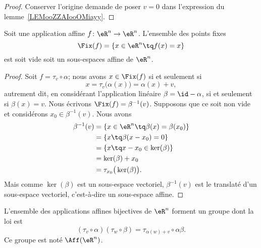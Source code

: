 \begin{proof}
    Conserver l'origine demande de poser \( v=0\) dans l'expression du lemme~\ref{LEMooZZAIooOMiayy}.
\end{proof}

\begin{proposition}     \label{PROPooYRCJooIcmUVI}
    Soit une application affine \( f\colon \eR^n\to \eR^n\). L'ensemble des points fixes
    \begin{equation}
        \Fix(f)=\{ x\in \eR^n\tq f(x)=x \}
    \end{equation}
    est soit vide soit un sous-espaces affine de \( \eR^n\).
\end{proposition}

\begin{proof}
    Soit \( f=\tau_v\circ \alpha\); nous avons \( x\in\Fix(f)\) si et seulement si
    \begin{equation}
        x=\tau_v\big( \alpha(x) \big)=\alpha(x)+v,
    \end{equation}
    autrement dit, en considérant l'application linéaire \( \beta=\id-\alpha\), si et seulement si \( \beta(x)=v\). Nous écrivons \( \Fix(f)=\beta^{-1}(v)\). Supposons que ce soit non vide et considérons \( x_0\in\beta^{-1}(v)\). Nous avons
    \begin{subequations}
        \begin{align}
            \beta^{-1}(v)&=\{ x\in \eR^n\tq \beta(x)=\beta(x_0) \}\\
            &=\{ x\tq \beta(x-x_0)=0 \}\\
            &=\{ x\tq x-x_0\in \ker(\beta) \}\\
            &=\ker(\beta)+x_0\\
            &=\tau_{x_0}\big( \ker(\beta) \big).
        \end{align}
    \end{subequations}
    Mais comme \( \ker(\beta)\) est un sous-espace vectoriel, \( \beta^{-1}(v)\) est le translaté d'un sous-espace vectoriel, c'est-à-dire un sous-espace affine.
\end{proof}

\begin{propositionDef}
    L'ensemble des applications affines bijectives de \( \eR^n\) forment un groupe dont la loi est
    \begin{equation}        \label{EQooMIFSooKIvPnW}
        (\tau_v\circ \alpha)(\tau_w\circ \beta)=\tau_{\alpha(w)+v}\circ \alpha\beta.
    \end{equation}
    Ce groupe est noté \( \Aff(\eR^n)\).
\end{propositionDef}

